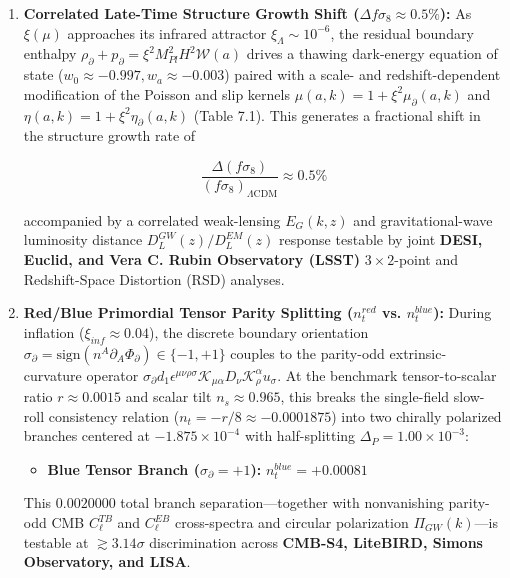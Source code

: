 \documentclass[aps,prd,onecolumn,superscriptaddress,nofootinbib,longbibliography,10pt]{revtex4-2}
\begin{document}
  
\begin{enumerate}
    
\item \textbf{Correlated Late-Time Structure Growth Shift (\(\Delta f\sigma_8 \approx 0.5\%\)):} As \(\xi(\mu)\) approaches its infrared attractor \(\xi_\Lambda \sim 10^{-6}\), the residual boundary enthalpy \(\rho_\partial + p_\partial = \xi^2 M_{Pl}^2 H^2 \mathcal{W}(a)\) drives a thawing dark-energy equation of state (\(w_0 \approx -0.997, w_a \approx -0.003\)) paired with a scale- and redshift-dependent modification of the Poisson and slip kernels \(\mu(a,k) = 1 + \xi^2 \mu_\partial(a,k)\) and \(\eta(a,k) = 1 + \xi^2 \eta_\partial(a,k)\) (Table 7.1). This generates a fractional shift in the structure growth rate of


\[\frac{\Delta(f\sigma_{8})}{(f\sigma_{8})_{\Lambda\mathrm{CDM}}} \approx 0.5\%\]


accompanied by a correlated weak-lensing \(E_G(k,z)\) and gravitational-wave luminosity distance \(D_L^{GW}(z)/D_L^{EM}(z)\) response testable by joint \textbf{DESI, Euclid, and Vera C. Rubin Observatory (LSST)} \(3 \times 2\)-point and Redshift-Space Distortion (RSD) analyses.
    
\item \textbf{Red/Blue Primordial Tensor Parity Splitting (\(n_t^{red}\) vs. \(n_t^{blue}\)):} During inflation (\(\xi_{inf} \approx 0.04\)), the discrete boundary orientation \(\sigma_\partial = \text{sign}(n^A\partial_A\Phi_\partial) \in \{-1, +1\}\) couples to the parity-odd extrinsic-curvature operator \(\sigma_\partial d_1 \epsilon^{\mu\nu\rho\sigma}\mathcal{K}_{\mu\alpha}D_\nu \mathcal{K}^\alpha_\rho u_\sigma\). At the benchmark tensor-to-scalar ratio \(r \approx 0.0015\) and scalar tilt \(n_s \approx 0.965\), this breaks the single-field slow-roll consistency relation (\(n_t = -r/8 \approx -0.0001875\)) into two chirally polarized branches centered at \(-1.875 \times 10^{-4}\) with half-splitting \(\Delta_P = 1.00 \times 10^{-3}\):
      
\begin{itemize}
        \textbf{Red Tensor Branch (\(\sigma_\partial = -1\)):} \(n_t^{red} = -0.00119\)
        
\item \textbf{Blue Tensor Branch (\(\sigma_\partial = +1\)):} \(n_t^{blue} = +0.00081\)
      
\end{itemize}

      This \(0.0020000\) total branch separation—together with nonvanishing parity-odd CMB \(C_\ell^{TB}\) and \(C_\ell^{EB}\) cross-spectra and circular polarization \(\Pi_{GW}(k)\)—is testable at \(\gtrsim 3.14\sigma\) discrimination across \textbf{CMB-S4, LiteBIRD, Simons Observatory, and LISA}.
    

\end{enumerate}
\end{document}
